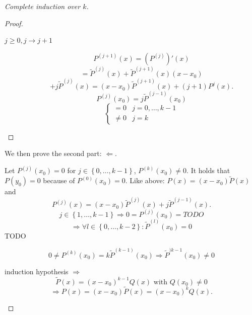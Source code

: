 \documentclass[a4paper,landscape,twocolumn]{article}
\theoremstyle{definition}
\newcommand\set[1]{\left\{#1\right\}}
\begin{document}
\begin{proof}[Complete induction over $k$]
\begin{description}
\begin{proof}
\begin{description}
          \item[$j \geq 0, j \to j+1$]
            \[ P^{(j+1)}(x) = \left(P^{(j)}\right)'(x) \]
            \[
              = \tilde{P}^{(j)}(x) + \tilde{P}^{(j+1)}(x) (x - x_0)
            \] \[
              + j \tilde{P}^{(j)}(x)
              = (x - x_0) \tilde{P}^{(j+1)}(x) + (j+1)P^{j}(x).
            \] \[
              P^{(j)}(x_0) = j \tilde{P}^{(j-1)}(x_0)
            \] \[
              \begin{cases}
                = 0 & j = 0,\ldots,k-1 \\
                \neq 0 & j = k
              \end{cases}
            \]
        \end{description}
      \end{proof}

      We then prove the second part: $\Leftarrow$.

      Let $P^{(j)}(x_0) = 0$ for $j \in \set{0,\ldots,k-1}$, $P^{(k)}(x_0) \neq 0$.
      It holds that $P(y_0) = 0$ because of $P^{(0)}(x_0) = 0$.
      Like above: $P(x) = (x - x_0) \tilde{P}(x)$ and
      \[ P^{(j)}(x) = (x - x_0) \tilde{P}^{(j)}(x) + j \tilde{P}^{(j-1)}(x). \]
      \[ j \in \set{1,\ldots,k-1} \Rightarrow 0 = P^{(j)}(x_0) = TODO \]
      \[ \Rightarrow \forall l \in \set{0,\ldots,k-2}: \tilde{P}^{(l)}(x_0) = 0 \]
      TODO

      \[ 0 \neq P^{(k)}(x_0) = k \tilde{P}^{(k-1)}(x_0) \Rightarrow \tilde{P}^{)k-1}(x_0) \neq 0 \]

      induction hypothesis $\Rightarrow$
      \[ \tilde{P}(x) = (x - x_0)^{k-1} Q(x) \text{ with } Q(x_0) \neq 0 \]
      \[ \Rightarrow P(x) = (x - x_0) \tilde{P}(x) = (x - x_0)^k Q(x). \]
  \end{description}
\end{proof}
\end{document}
